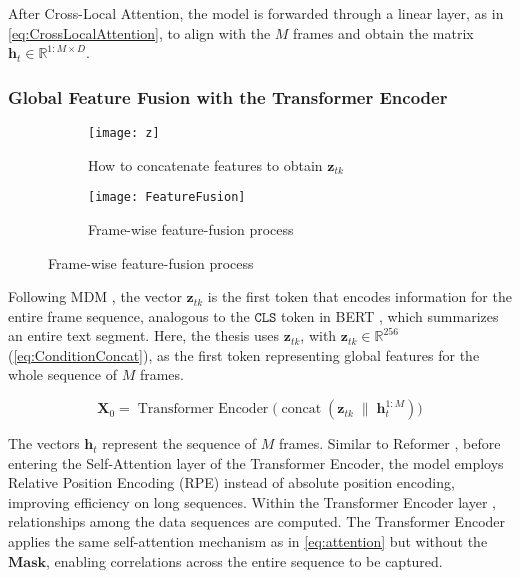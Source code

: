 After Cross-Local Attention, the model is forwarded through a linear layer, as in \autoref{eq:CrossLocalAttention}, to align with the $M$ frames and obtain the matrix $\mathbf{h}_t \in \mathbb{R}^{1:M \times D}$.

\subsubsection{Global Feature Fusion with the Transformer Encoder}

\begin{figure}[H]
	\centering
	\begin{subfigure}{0.42\textwidth}
		\centering
		\texttt{[image: z]}
		\caption{How to concatenate features to obtain $\mathbf{z}_{tk}$}
		\label{fig:FeatureFusion}
	\end{subfigure}
	\hfill
	\begin{subfigure}{0.55\textwidth}
		\centering
		\texttt{[image: FeatureFusion]}
		\caption{Frame-wise feature-fusion process}
		\label{fig:ZToken}
	\end{subfigure}
\end{figure}

Following MDM \cite{tevet2022human}, the vector $\mathbf{z}_{tk}$ is the first token that encodes information for the entire frame sequence, analogous to the $\texttt{CLS}$ token in BERT \cite{devlin2019bertpretrainingdeepbidirectional}, which summarizes an entire text segment.
Here, the thesis uses $\mathbf{z}_{tk}$, with $\mathbf{z}_{tk} \in \mathbb{R}^{256}$ (\autoref{eq:ConditionConcat}), as the first token representing global features for the whole sequence of $M$ frames.

\begin{equation}
	\mathbf{X}_{0} = \operatorname{Transformer\ Encoder}\bigl(\operatorname{concat}(\mathbf{z}_{tk} \;\|\; \mathbf{h}^{1:M}_{t})\bigr)
	\label{eq:TransformerEncoder}
\end{equation}

The vectors $\mathbf{h}_t$ represent the sequence of $M$ frames. Similar to Reformer \cite{kitaev2020reformer}, before entering the Self-Attention layer of the Transformer Encoder, the model employs Relative Position Encoding (RPE) instead of absolute position encoding, improving efficiency on long sequences.
Within the Transformer Encoder layer \cite{vaswani2017attention}, relationships among the data sequences are computed.
The Transformer Encoder applies the same self-attention mechanism as in \autoref{eq:attention} but without the $\mathbf{Mask}$, enabling correlations across the entire sequence to be captured.

